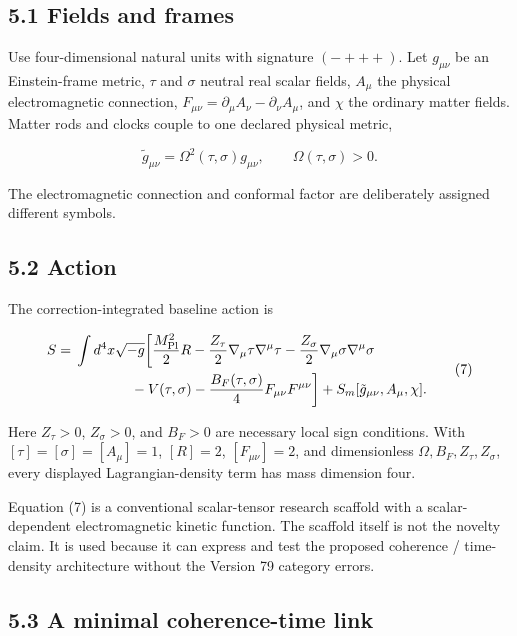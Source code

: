 \documentclass[
  american,
  11pt,
  letterpaper,
]{article}
\begin{document}
\subsection{5.1 Fields and frames}\label{fields-and-frames}

Use four-dimensional natural units with signature \((- + + +)\). Let \(g_{\mu\nu}\) be an Einstein-frame metric, \(\tau\) and \(\sigma\) neutral real scalar fields, \(A_\mu\) the physical electromagnetic connection, \(F_{\mu\nu}=\partial_\mu A_\nu-\partial_\nu A_\mu\), and \(\chi\) the ordinary matter fields. Matter rods and clocks couple to one declared physical metric,

\begin{equation}
\tilde g_{\mu\nu}=\Omega^2(\tau,\sigma)g_{\mu\nu},
\qquad \Omega(\tau,\sigma)>0 .
\tag{6}
\end{equation}

The electromagnetic connection and conformal factor are deliberately assigned different symbols.

\subsection{5.2 Action}\label{action}

The correction-integrated baseline action is

\[
\begin{aligned}
S={}&\int d^4x\sqrt{-g}\bigg[
\frac{M_{\rm Pl}^2}{2}R
-\frac{Z_\tau}{2}\nabla_\mu\tau\nabla^\mu\tau
-\frac{Z_\sigma}{2}\nabla_\mu\sigma\nabla^\mu\sigma\\
&\qquad\qquad
-V(\tau,\sigma)
-\frac{B_F(\tau,\sigma)}{4}F_{\mu\nu}F^{\mu\nu}
\bigg]
+S_m[\tilde g_{\mu\nu},A_\mu,\chi].
\end{aligned} \tag{7}
\]

Here \(Z_\tau>0\), \(Z_\sigma>0\), and \(B_F>0\) are necessary local sign conditions. With \([\tau]=[\sigma]=[A_\mu]=1\), \([R]=2\), \([F_{\mu\nu}]=2\), and dimensionless \(\Omega,B_F,Z_\tau,Z_\sigma\), every displayed Lagrangian-density term has mass dimension four.

Equation (7) is a conventional scalar-tensor research scaffold with a scalar-dependent electromagnetic kinetic function. The scaffold itself is not the novelty claim. It is used because it can express and test the proposed coherence / time-density architecture without the Version 79 category errors.

\subsection{5.3 A minimal coherence-time link}\label{a-minimal-coherence-time-link}
\end{document}
